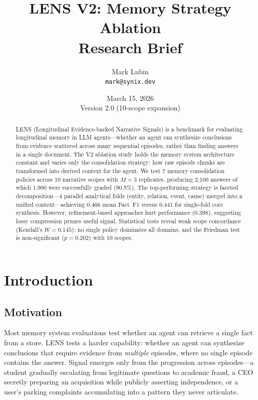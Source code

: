 \documentclass[11pt,a4paper]{article}
\title{\textbf{LENS V2: Memory Strategy Ablation} \\[0.3em]
\large Research Brief}
\author{Mark Lubin \\ \texttt{mark@synix.dev}}
\date{March 15, 2026 \\ Version 2.0 (10-scope expansion)}
\begin{document}
\maketitle

\begin{abstract}
LENS (Longitudinal Evidence-backed Narrative Signals) is a benchmark for evaluating longitudinal memory in LLM agents---whether an agent can synthesize conclusions from evidence scattered across many sequential episodes, rather than finding answers in a single document. The V2 ablation study holds the memory system architecture constant and varies only the consolidation strategy: how raw episode chunks are transformed into derived context for the agent. We test 7 memory consolidation policies across 10 narrative scopes with $M{=}3$ replicates, producing 2,100 answers of which 1,900 were successfully graded (90.5\%). The top-performing strategy is faceted decomposition---4 parallel analytical folds (entity, relation, event, cause) merged into a unified context---achieving 0.466 mean Fact~F1 versus 0.441 for single-fold core synthesis. However, refinement-based approaches hurt performance (0.398), suggesting lossy compression prunes useful signal. Statistical tests reveal weak scope concordance (Kendall's $W = 0.145$): no single policy dominates all domains, and the Friedman test is non-significant ($p = 0.202$) with 10 scopes.
\end{abstract}

\section{Introduction}

\subsection{Motivation}

Most memory system evaluations test whether an agent can retrieve a single fact from a store. LENS tests a harder capability: whether an agent can synthesize conclusions that require evidence from \emph{multiple} episodes, where no single episode contains the answer. Signal emerges only from the progression across episodes---a student gradually escalating from legitimate questions to academic fraud, a CEO secretly preparing an acquisition while publicly asserting independence, or a user's parking complaints accumulating into a pattern they never articulate.
\end{document}
